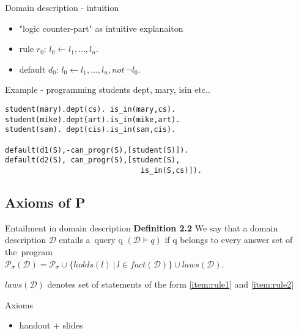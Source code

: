 \documentclass{beamer}
\begin{document}
  \begin{frame}{Domain description - intuition}
    \begin{itemize}
      \item "logic counter-part" as intuitive explanaiton\\
      \item rule $r_0$:    $ l_0 \leftarrow l_1, \dots, l_n. $
      \item default $d_0$: $ l_0 \leftarrow l_1, \dots, l_n, not ~ \neg l_0. $
    \end{itemize}
  \end{frame}
  
  
  \begin{frame}{Example - programming students}
    dept, mary, isin etc..
    \begin{alltt}
student(mary). dept(cs). \ is\_in(mary,cs). \\
student(mike). dept(art). is\_in(mike,art).\\
student(sam). \ dept(cis). is\_in(sam,cis). \\ ~ \\
default(d1(S), -can\_progr(S), [student(S)]). \\
default(d2(S), \ can\_progr(S), [student(S), \\
\ \ \ \ \ \ \ \ \ \ \ \ \ \ \ \ \ \ \ \ \ \ \ \ \ \ \ \ \ \ \ is\_in(S, cs)]).
    \end{alltt}
  \end{frame}
  
  
  \subsection{Axioms of P}
  
  \begin{frame}{Entailment in domain description}
    \textbf{Definition 2.2} We say that a domain description $\mathcal{D}$ entails
    a~query q $(\mathcal{D} \models q)$ if q belongs to every answer set
    of the~program \\
    $\mathcal{P}_\sigma(\mathcal{D}) = \mathcal{P}_\sigma \cup \{ holds(l) \ | \ l \in fact(\mathcal{D}) \} \cup laws(\mathcal{D})$. 
  
    $laws(\mathcal{D})$ denotes set of statements of the form \ref{item:rule1} and \ref{item:rule2}
    \end{frame}
  
  
  \begin{frame}{Axioms}
    \begin{itemize}
      \item handout + slides
    \end{itemize}
  \end{frame}
  
\end{document}
